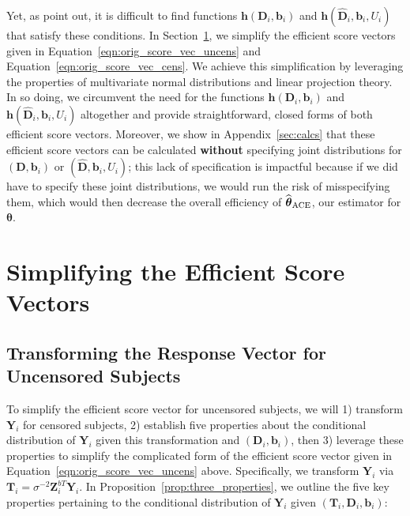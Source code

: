 \documentclass[12pt]{article}
\def\wh{\widehat}
\def\wh{\widehat}
\def\btheta{{\boldsymbol{\theta}}}
\def\bb{{\boldsymbol b}}
\def\bh{{\boldsymbol h}}
\def\bD{{\boldsymbol D}}
\def\bT{{\boldsymbol T}}
\def\bY{{\boldsymbol Y}}
\def\bZ{{\boldsymbol Z}}
\def\tilD{\bD}
\def\ACEest{\wh{\btheta}_{\rm ACE}}
\begin{document}
Yet, as \cite{garcia2016optimal} point out, it is difficult to find functions  $\bh(\tilD_i,\bb_i)$ and $\bh(\widehat{\tilD}_i,\bb_i,U_i)$ that satisfy these conditions. In Section~\ref{sec:simplify_score_vector}, we simplify the efficient score vectors given in Equation~\eqref{eqn:orig_score_vec_uncens} and Equation~\eqref{eqn:orig_score_vec_cens}. We achieve this simplification by leveraging the properties of multivariate normal distributions and linear projection theory. In so doing, we circumvent the need for the functions $\bh(\tilD_i,\bb_i)$ and $\bh(\widehat{\tilD}_i,\bb_i,U_i)$ altogether and provide straightforward, closed forms of both efficient score vectors. Moreover, we show in Appendix~\ref{sec:calcs} that these efficient score vectors can be calculated \textbf{without} specifying joint distributions for $(\tilD, \bb_i)$ or $(\widehat{\tilD}, \bb_i, U_i)$; this lack of specification is impactful because if we did have to specify these joint distributions, we would run the risk of misspecifying them, which would then decrease the overall efficiency of $\ACEest$, our estimator for $\btheta$.

\section{Simplifying the Efficient Score Vectors}
\label{sec:simplify_score_vector}

\subsection{Transforming the Response Vector for Uncensored Subjects}
\label{sec:simplify_score_vector_uncens}
To simplify the efficient score vector for uncensored subjects, we will 1) transform $\bY_i$ for censored subjects, 2) establish five properties about the conditional distribution of $\bY_i$ given this transformation and $(\tilD_i,\bb_i)$, then 3) leverage these properties to simplify the complicated form of the efficient score vector given in Equation~\eqref{eqn:orig_score_vec_uncens} above. Specifically, we transform $\bY_i$ via $\bT_i=\sigma^{-2}\bZ^{bT}_i\bY_i$. In Proposition~\ref{prop:three_properties}, we outline the five key properties pertaining to the conditional distribution of $\bY_i$ given $(\bT_i,\tilD_i,\bb_i)$:
\end{document}
